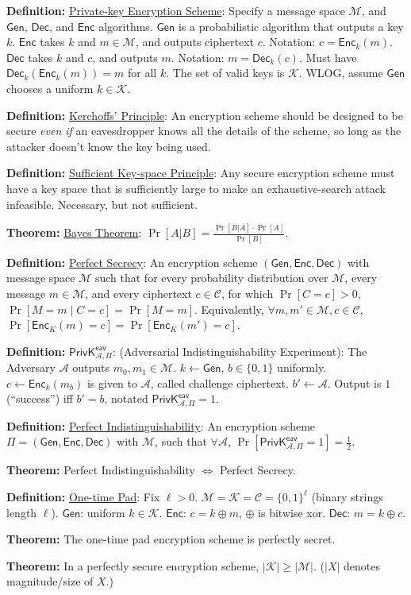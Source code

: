 \documentclass[10pt]{article}
\newcommand{\AAA}{\mathcal{A}}
\newcommand{\CCC}{\mathcal{C}}
\newcommand{\KKK}{\mathcal{K}}
\newcommand{\MMM}{\mathcal{M}}
\newcommand{\defn}[1]{{\bf Definition:} \underline{#1}}
\newcommand{\thm}[1]{{\bf Theorem:} \underline{#1}}
\newcommand{\Enc}{\mathsf{Enc}}
\newcommand{\Dec}{\mathsf{Dec}}
\newcommand{\Gen}{\mathsf{Gen}}
\newcommand{\GenEncDec}{(\Gen,\Enc,\Dec)}
\newcommand{\ExptEavArgs}[2]{\mathsf{PrivK}^{\mathsf{eav}}_{#1,#2}}
\newcommand{\ExptEav}{\ExptEavArgs{\AAA}{\Pi}}
\newcommand{\xor}{\oplus}
\newcommand{\from}{\leftarrow}
\begin{document}
\footnotesize
\begin{multicols}{4}

\defn{Private-key Encryption Scheme}: Specify a message space $\MMM$, and $\Gen$, $\Dec$, and $\Enc$ algorithms. $\Gen$ is a probabilistic algorithm that outputs a key $k$. $\Enc$ takes $k$ and $m\in\MMM$, and outputs ciphertext $c$. Notation: $c=\Enc_k(m)$. $\Dec$ takes $k$ and $c$, and outputs $m$. Notation: $m=\Dec_k(c)$. Must have $\Dec_k(\Enc_k(m))=m$ for all $k$. The set of valid keys is $\KKK$. WLOG, assume $\Gen$ chooses a uniform $k\in\KKK$.

\defn{Kerchoffs' Principle}: An encryption scheme should be designed to be secure {\it even if} an eavesdropper knows all the details of the scheme, so long as the attacker doesn't know the key being used. 

\defn{Sufficient Key-space Principle}: Any secure encryption scheme must have a key space that is sufficiently large to make an exhaustive-search attack infeasible. Necessary, but not sufficient.

\thm{Bayes Theorem}: $\Pr[A|B]=\frac{\Pr[B|A]\cdot\Pr[A]}{\Pr[B]}$.

\defn{Perfect Secrecy}: An encryption scheme $\GenEncDec$ with message space $\MMM$ such that for every probability distribution over $\MMM$, every message $m\in \MMM$, and every ciphertext $c\in\CCC$, for which $\Pr[C=c]>0$, $\Pr[M=m\mid C=c]=\Pr[M=m]$. Equivalently, $\forall m,m'\in\MMM,c\in\CCC$, $\Pr[\Enc_K(m)=c]=\Pr[\Enc_K(m')=c]$.

\defn{$\ExptEav$}: (Adversarial Indistinguishability Experiment): The Adversary $\AAA$ outputs $m_0,m_1\in\MMM$. $k\from\Gen$, $b\in\{0,1\}$ uniformly. $c\from\Enc_k(m_b)$ is given to $\AAA$, called challenge ciphertext. $b'\from\AAA$. Output is $1$ (``success'') iff $b'=b$, notated $\ExptEav=1$.

\defn{Perfect Indistinguishability}: An encryption scheme $\Pi=\GenEncDec$ with $\MMM$, such that $\forall\AAA$, $\Pr[\ExptEav=1]=\frac{1}{2}$.

\thm{}Perfect Indistinguishability $\Leftrightarrow$ Perfect Secrecy.

\defn{One-time Pad}: Fix $\ell>0$. $\MMM=\KKK=\CCC=\{0,1\}^\ell$ (binary strings length $\ell$). $\Gen$: uniform $k\in\KKK$. $\Enc$: $c=k\xor m$, $\xor$ is bitwise xor. $\Dec$: $m=k\xor c$.

\thm{}The one-time pad encryption scheme is perfectly secret.

\thm{}In a perfectly secure encryption scheme, $|\KKK|\geq|\MMM|$. ($|X|$ denotes magnitude/size of $X$.)


\end{multicols}
\end{document}
